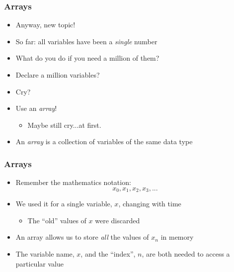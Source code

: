 \documentclass[14pt]{beamer}
\begin{document}
\begin{frame}
\frametitle{Arrays}
\begin{itemize}
\item Anyway, new topic!
\item So far: all variables have been a \textit{single} number
\item What do you do if you need a million of them?
\pause
\item Declare a million variables?
\pause
\item Cry?
\pause
\item Use an \textit{array}!
\pause
	\begin{itemize}
		\item Maybe still cry...at first.
	\end{itemize}
\pause
\item An \textit{array} is a collection of variables of the same data type
\end{itemize}
\end{frame}

\begin{frame}
\frametitle{Arrays}
\begin{itemize}
\item Remember the mathematics notation:
\begin{equation*}
x_0, x_1, x_2, x_3, ...
\end{equation*}
\item We used it for a single variable, $x$, changing with time
	\begin{itemize}
		\item The ``old'' values of $x$ were discarded
	\end{itemize}
\pause
\item An array allows us to store \textit{all} the values of $x_n$ in memory
\item The variable name, $x$, and the ``index'', $n$, are both needed to access a particular value
\end{itemize}
\end{frame}
\end{document}
